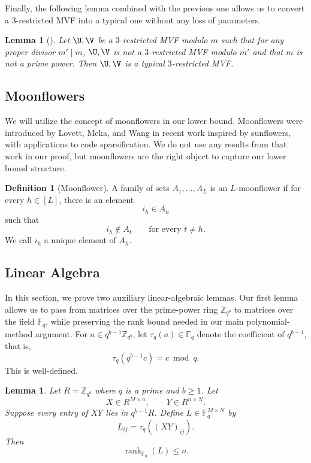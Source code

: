 \documentclass[11pt]{article}
\newtheorem{lemma}[maintheorem]{Lemma}
\theoremstyle{definition}
\newtheorem{definition}[maintheorem]{Definition}
\begin{document}
Finally, the following lemma combined with the previous one allows us to convert a $3$-restricted MVF into a typical one without any loss of parameters. 

\begin{lemma}[\cite{aggarwal2025}] \label{lem:residues}
    Let $\U, \V$ be a $3$-restricted MVF modulo $m$ such that for any proper divisor $m' \mid m $, $\U, \V$ is not a $3$-restricted MVF modulo $m'$ and that $m$ is not a prime power. Then $\U, \V$ is a typical $3$-restricted MVF. 
\end{lemma}

\subsection{Moonflowers}

We will utilize the concept of moonflowers in our lower bound. Moonflowers were introduced by Lovett, Meka, and Wang in recent work inspired by sunflowers, with applications to code sparsification. We do not use any results from that work in our proof, but moonflowers are the right object to capture our lower bound structure.

\begin{definition}[Moonflower]\label{def:moonflower}
A family of sets $A_1,\ldots,A_L$ is an $L$-moonflower if for every $h\in[L]$, there is an element
\[
i_h\in A_h
\]
such that
\[
i_h\notin A_t
\qquad
\text{for every }t\ne h.
\]
We call $i_h$ a unique element of $A_h$.
\end{definition}


\subsection{Linear Algebra}

In this section, we prove two auxiliary linear-algebraic lemmas. Our first lemma allows us to pass from matrices over the prime-power ring $\mathbb{Z}_{q^b}$ to matrices over the field $\mathbb{F}_q$, while preserving the rank bound needed in our main polynomial-method argument.
For $a \in q^{b-1}\mathbb Z_{q^b}$, let $\tau_q(a)\in\mathbb F_q$ denote the coefficient of $q^{b-1}$, that is,
\[
\tau_q(q^{b-1}c)=c\bmod q.
\]
This is well-defined.
\begin{lemma} \label{lem:coeff_rank}
Let $R=\mathbb Z_{q^b}$ where $q$ is a prime and $b \geq 1$. Let
\[
X\in R^{M\times n},
\qquad
Y\in R^{n\times N}.
\]
Suppose every entry of $XY$ lies in $q^{b-1}R$. Define $L\in\mathbb F_q^{M\times N}$ by
\[
L_{ij}=\tau_q((XY)_{ij}).
\]
Then
\[
\operatorname{rank}_{\mathbb F_q}(L)\le n.
\]
\end{lemma}
\end{document}

